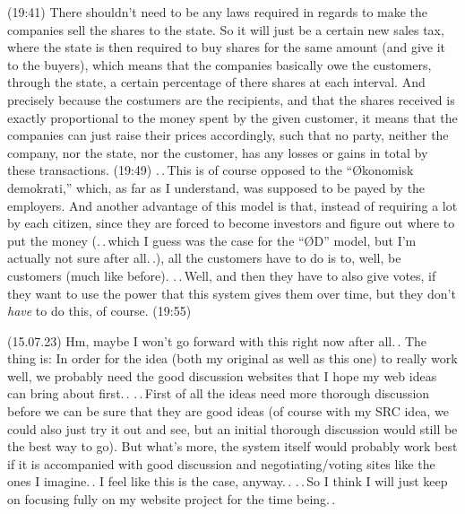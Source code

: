 \documentclass{report}
\begin{document}
(19:41) There shouldn't need to be any laws required in regards to make the companies sell the shares to the state. So it will just be a certain new sales tax, where the state is then required to buy shares for the same amount (and give it to the buyers), which means that the companies basically owe the customers, through the state, a certain percentage of there shares at each interval. And precisely because the costumers are the recipients, and that the shares received is exactly proportional to the money spent by the given customer, it means that the companies can just raise their prices accordingly, such that no party, neither the company, nor the state, nor the customer, has any losses or gains in total by these transactions. (19:49) .\,.\,This is of course opposed to the ``Økonomisk demokrati,'' which, as far as I understand, was supposed to be payed by the employers. And another advantage of this model is that, instead of requiring a lot by each citizen, since they are forced to become investors and figure out where to put the money (.\,.\,which I guess was the case for the ``ØD'' model, but I'm actually not sure after all.\,.), all the customers have to do is to, well, be customers (much like before). .\,.\,Well, and then they have to also give votes, if they want to use the power that this system gives them over time, but they don't \emph{have} to do this, of course. (19:55)

(15.07.23) Hm, maybe I won't go forward with this right now after all.\,. The thing is: In order for the idea (both my original as well as this one) to really work well, we probably need the good discussion websites that I hope my web ideas can bring about first.\,. .\,.\,First of all the ideas need more thorough discussion before we can be sure that they are good ideas (of course with my SRC idea, we could also just try it out and see, but an initial thorough discussion would still be the best way to go). But what's more, the system itself would probably work best if it is accompanied with good discussion and negotiating/voting sites like the ones I imagine.\,. I feel like this is the case, anyway.\,. .\,.\,So I think I will just keep on focusing fully on my website project for the time being.\,.
\end{document}

